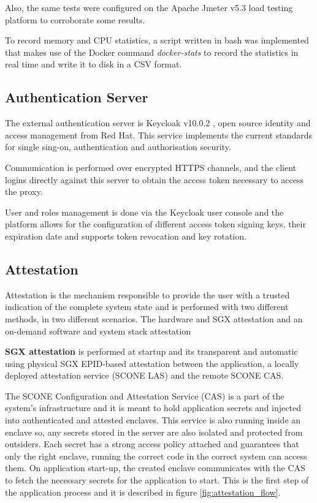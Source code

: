 Also, the same tests were configured on the Apache Jmeter v5.3\cite{jmeter:1} load testing platform to corroborate some results.

To record memory and \gls{CPU} statistics, a script written in bash was implemented that makes use of the Docker command \textit{docker-stats} to record the statistics in real time and write it to disk in a \gls{CSV} format.

\subsection{Authentication Server}
\label{ssec:implementation_authentication_server}

The external authentication server is Keycloak v10.0.2 \cite{keycloak:1}, open source identity and access management from Red Hat. This service implements the current standards for single sing-on, authentication and authorisation security.

Communication is performed over encrypted \gls{HTTPS} channels, and the client logins directly against this server to obtain the access token necessary to access the proxy.

User and roles management is done via the Keycloak user console and the platform allows for the configuration of different access token signing keys, their expiration date and supports token revocation and key rotation.

\subsection{Attestation}
\label{ssec:implementation_of_attestation}

Attestation is the mechanism responsible to provide the user with a trusted indication of the complete system state and is performed with two different methods, in two different scenarios. The hardware and \gls{SGX} attestation and an on-demand software and system stack attestation

\textbf{\gls{SGX} attestation} is performed at startup and its transparent and automatic using physical \gls{SGX} \gls{EPID}-based attestation between the application, a locally deployed attestation service (SCONE \gls{LAS}) and the remote SCONE \gls{CAS}. 

The SCONE Configuration and Attestation Service (\gls{CAS}) is a part of the system's infrastructure and it is meant to hold application secrets and injected into authenticated and attested enclaves. This service is also running inside an enclave so, any secrets stored in the server are also isolated and protected from outsiders. Each secret has a strong access policy attached and guarantees that only the right enclave, running the correct code in the correct system can access them. On application start-up, the created enclave communicates with the CAS to fetch the necessary secrets for the application to start. This is the first step of the application process and it is described in figure \ref{fig:attestation_flow}. 

